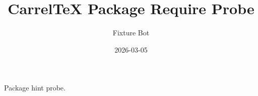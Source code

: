 \documentclass{article}
\title{CarrelTeX Package Require Probe}
\author{Fixture Bot}
\date{2026-03-05}
\begin{document}
\maketitle

Package hint probe.
\end{document}
